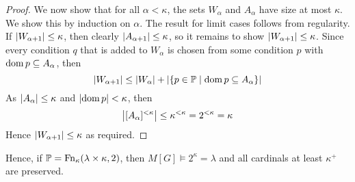 \begin{proof}
    We now show that for all \( \alpha < \kappa \), the sets \( W_\alpha \) and \( A_\alpha \) have size at most \( \kappa \).
    We show this by induction on \( \alpha \).
    The result for limit cases follows from regularity.
    If \( \abs{W_{\alpha + 1}} \leq \kappa \), then clearly \( \abs{A_{\alpha + 1}} \leq \kappa \), so it remains to show \( \abs{W_{\alpha + 1}} \leq \kappa \).
    Since every condition \( q \) that is added to \( W_\alpha \) is chosen from some condition \( p \) with \( \operatorname{dom} p \subseteq A_\alpha \), then
    \[ \abs{W_{\alpha + 1}} \leq \abs{W_\alpha} + \abs{\qty{p \in \mathbb P \mid \operatorname{dom}p \subseteq A_\alpha}} \]
    As \( \abs{A_\alpha} \leq \kappa \) and \( \abs{\operatorname{dom} p} < \kappa \), then
    \[ \abs{[A_\alpha]^{<\kappa}} \leq \kappa^{<\kappa} = 2^{<\kappa} = \kappa \]
    Hence \( \abs{W_{\alpha + 1}} \leq \kappa \) as required.
\end{proof}
Hence, if \( \mathbb P = \operatorname{Fn}_\kappa(\lambda \times \kappa, 2) \), then \( M[G] \vDash 2^\kappa = \lambda \) and all cardinals at least \( \kappa^+ \) are preserved.

